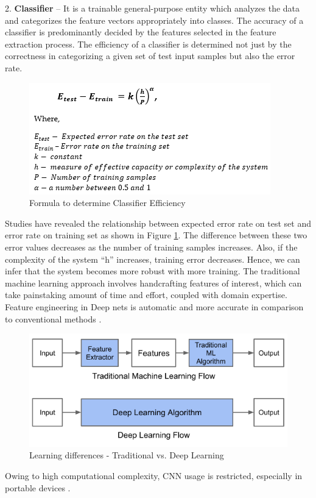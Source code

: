 2.	\textbf{Classifier} – \newline
It is a trainable general-purpose entity which analyzes the data and categorizes the feature vectors appropriately into classes. The accuracy of a classifier is predominantly decided by the features selected in the feature extraction process. \newline
The efficiency of a classifier is determined not just by the correctness in categorizing a given set of test input samples but also the error rate. 
\begin{figure}[h!]
  \centering
  \includegraphics[width=0.7\linewidth]{figures/classifier_efficiency_formula.PNG}
  \caption{Formula to determine Classifier Efficiency
  \cite{lecun1998gradient}}
  \label{fig:classifier_efficiency_formula}
\end{figure}
\newline Studies have revealed the relationship between expected error rate on test set and error rate on training set as shown in Figure \ref{fig:classifier_efficiency_formula}. The difference between these two error values decreases as the number of training samples increases. Also, if the complexity of the system “h” increases, training error decreases. Hence, we can infer that the system becomes more robust with more training. 
\newline \newline
The traditional machine learning approach involves handcrafting features of interest, which can take painstaking amount of time and effort, coupled with domain expertise. Feature engineering in Deep nets is automatic and more accurate in comparison to conventional methods \cite{dlintro_am}.
\begin{figure}[h!]
  \centering
  \includegraphics[width=0.7\linewidth]{figures/dlvsml.png}
  \caption{Learning differences - Traditional vs. Deep Learning
  \cite{dlintro_am}}
  \label{fig:deep_learning_flow}
\end{figure}
\newline
Owing to high computational complexity, CNN usage is restricted, especially in portable devices \cite{gysel2016hardware}. 


